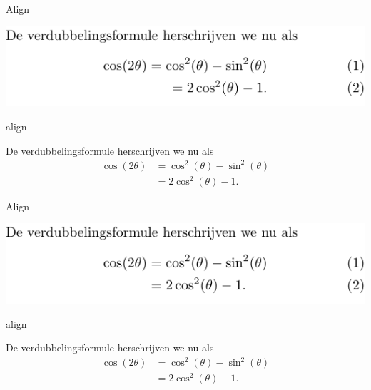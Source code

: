 \documentclass[presentatie.tex]{subfiles}
\begin{document}

\begin{frame}{Align}

	\includegraphics[width=\linewidth,height=0.4\textheight,keepaspectratio]{assets/5_Formules/mathAlignUnaligned.pdf}
\end{frame}

\begin{saveblock}{align}
	\begin{highlightblock}[gobble=8,linewidth=\textwidth,
		framexleftmargin=0.25em,xleftmargin=0.25em]
		De verdubbelingsformule herschrijven we nu als
		\begin{align}
			\cos(2\theta) &= \cos^2(\theta) - \sin^2(\theta)\\
			&= 2\cos^2(\theta)-1.
		\end{align}
	\end{highlightblock}
\end{saveblock}

\begin{frame}{Align}

	\includegraphics[width=\linewidth,height=0.4\textheight,keepaspectratio]{assets/5_Formules/mathAlignDoubleNumber.pdf}
\end{frame}


\begin{saveblock}{align}
	\begin{highlightblock}[gobble=8,linewidth=\textwidth,
		framexleftmargin=0.25em,xleftmargin=0.25em]
		De verdubbelingsformule herschrijven we nu als
		\begin{align}
			\cos(2\theta) &= \cos^2(\theta) - \sin^2(\theta)
			\nonumber\\
			&= 2\cos^2(\theta)-1.
		\end{align}
	\end{highlightblock}
\end{saveblock}
\end{document}
